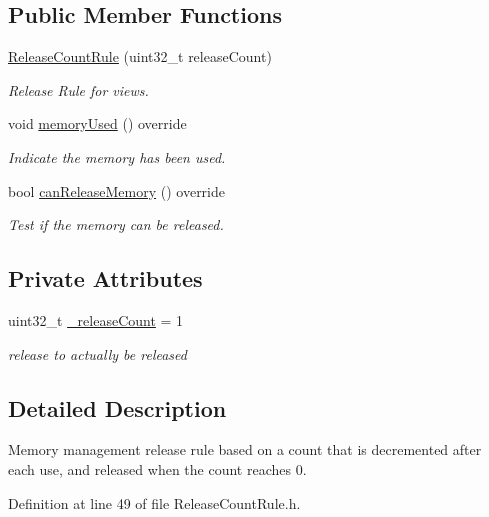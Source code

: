 \subsection*{Public Member Functions}
\begin{DoxyCompactItemize}
\item 
\hyperlink{classfi_1_1ReleaseCountRule_afa61c9e8da9b8710c3b8ccfd159f9bab}{Release\+Count\+Rule} (uint32\+\_\+t release\+Count)
\begin{DoxyCompactList}\small\item\em Release Rule for views. \end{DoxyCompactList}\item 
void \hyperlink{classfi_1_1ReleaseCountRule_a0e452931ebff91183524aa5cfc339485}{memory\+Used} () override
\begin{DoxyCompactList}\small\item\em Indicate the memory has been used. \end{DoxyCompactList}\item 
bool \hyperlink{classfi_1_1ReleaseCountRule_abfe693ebddb1e75e8149489df2ed867a}{can\+Release\+Memory} () override
\begin{DoxyCompactList}\small\item\em Test if the memory can be released. \end{DoxyCompactList}\end{DoxyCompactItemize}
\subsection*{Private Attributes}
\begin{DoxyCompactItemize}
\item 
uint32\+\_\+t \hyperlink{classfi_1_1ReleaseCountRule_adae4400daea0e3ca57a2e355bbc78046}{\+\_\+release\+Count} = 1
\begin{DoxyCompactList}\small\item\em release to actually be released \end{DoxyCompactList}\end{DoxyCompactItemize}


\subsection{Detailed Description}
Memory management release rule based on a count that is decremented after each use, and released when the count reaches 0. 

Definition at line 49 of file Release\+Count\+Rule.\+h.



